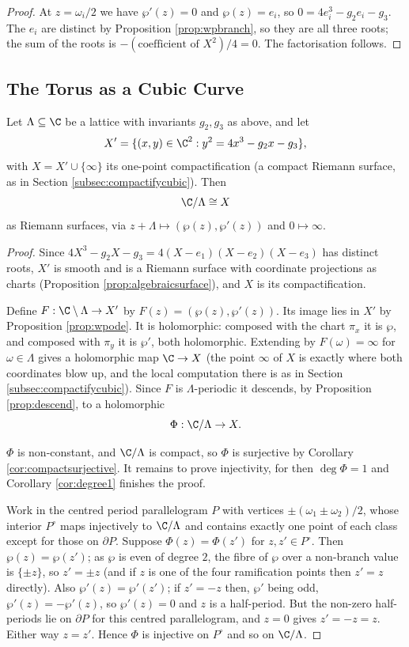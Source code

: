 \begin{proof}
	At $z = \omega_i/2$ we have $\wp'(z) = 0$ and $\wp(z) = e_i$, so
	$0 = 4e_i^3 - g_2e_i - g_3$. The $e_i$ are distinct by Proposition \ref{prop:wpbranch},
	so they are all three roots; the sum of the roots is $-(\text{coefficient of }X^2)/4 = 0$.
	The factorisation follows.
\end{proof}

\subsection{The Torus as a Cubic Curve}

\begin{theorem}\label{thm:toruscubic}
	Let $\Lambda\subseteq\C$ be a lattice with invariants $g_2, g_3$ as above, and let
	$$
	X' = \{(x,y)\in\C^2 : y^2 = 4x^3-g_2x-g_3\},
	$$
	with $X = X'\cup\{\infty\}$ its one-point compactification (a compact Riemann surface,
	as in Section \ref{subsec:compactifycubic}). Then
	$$
	\C/\Lambda \cong X
	$$
	as Riemann surfaces, via $z + \Lambda \mapsto (\wp(z),\wp'(z))$ and $0 \mapsto \infty$.
\end{theorem}

\begin{proof}
	Since $4X^3-g_2X-g_3 = 4(X-e_1)(X-e_2)(X-e_3)$ has distinct roots, $X'$ is smooth and
	is a Riemann surface with coordinate projections as charts (Proposition
	\ref{prop:algebraicsurface}), and $X$ is its compactification.

	Define $F : \C\setminus\Lambda \to X'$ by $F(z) = (\wp(z),\wp'(z))$. Its image lies in
	$X'$ by Proposition \ref{prop:wpode}. It is holomorphic: composed with the chart
	$\pi_x$ it is $\wp$, and composed with $\pi_y$ it is $\wp'$, both holomorphic. Extending
	by $F(\omega)=\infty$ for $\omega \in \Lambda$ gives a holomorphic map $\C \to X$ (the
	point $\infty$ of $X$ is exactly where both coordinates blow up, and the local
	computation there is as in Section \ref{subsec:compactifycubic}). Since $F$ is
	$\Lambda$-periodic it descends, by Proposition \ref{prop:descend}, to a holomorphic
	$$
	\Phi : \C/\Lambda \to X.
	$$

	$\Phi$ is non-constant, and $\C/\Lambda$ is compact, so $\Phi$ is surjective by
	Corollary \ref{cor:compactsurjective}. It remains to prove injectivity, for then
	$\deg\Phi = 1$ and Corollary \ref{cor:degree1} finishes the proof.

	Work in the centred period parallelogram $P$ with vertices $\pm(\omega_1\pm\omega_2)/2$,
	whose interior $P^\circ$ maps injectively to $\C/\Lambda$ and contains exactly one
	point of each class except for those on $\partial P$. Suppose $\Phi(z)=\Phi(z')$ for
	$z,z' \in P^\circ$. Then $\wp(z)=\wp(z')$; as $\wp$ is even of degree $2$, the fibre of
	$\wp$ over a non-branch value is $\{\pm z\}$, so $z' = \pm z$ (and if $z$ is one of the
	four ramification points then $z'=z$ directly). Also $\wp'(z)=\wp'(z')$; if $z'=-z$
	then, $\wp'$ being odd, $\wp'(z) = -\wp'(z)$, so $\wp'(z)=0$ and $z$ is a half-period.
	But the non-zero half-periods lie on $\partial P$ for this centred parallelogram, and
	$z = 0$ gives $z' = -z = z$. Either way $z=z'$. Hence $\Phi$ is injective on $P^\circ$
	and so on $\C/\Lambda$.
\end{proof}

